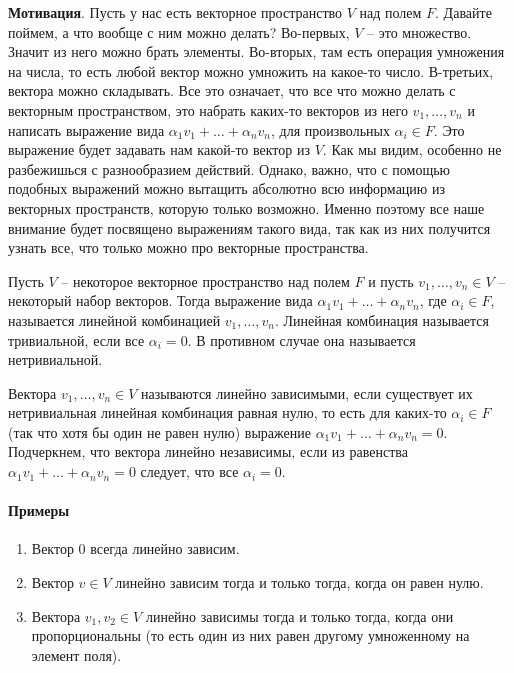 \documentclass{article}
\begin{document}
\textbf{Мотивация}. Пусть у нас есть векторное пространство $V$ над полем $F$.
Давайте поймем, а что вообще с ним можно делать?
Во-первых, $V$ -- это множество.
Значит из него можно брать элементы.
Во-вторых, там есть операция умножения на числа, то есть любой вектор можно умножить на какое-то число.
В-третьих, вектора можно складывать.
Все это означает, что все что можно делать с векторным пространством, это набрать каких-то векторов из него $v_1,\ldots,v_n$ и написать выражение вида $\alpha_1 v_1 + \ldots + \alpha_n v_n$, для произвольных $\alpha_i\in F$.
Это выражение будет задавать нам какой-то вектор из $V$.
Как мы видим, особенно не разбежишься с разнообразием действий.
Однако, важно, что с помощью подобных выражений можно вытащить абсолютно всю информацию из векторных пространств, которую только возможно.
Именно поэтому все наше внимание будет посвящено выражениям такого вида, так как из них получится узнать все, что только можно про векторные пространства.

\begin{definition*}
	Пусть $V$ -- некоторое векторное пространство над полем $F$ и пусть $v_1,\ldots,v_n\in V$ -- некоторый набор векторов.
	Тогда выражение вида $\alpha_1 v_1 +\ldots + \alpha_n v_n$, где $\alpha_i\in F$, называется линейной комбинацией $v_1,\ldots,v_n$.
	Линейная комбинация называется тривиальной, если все $\alpha_i = 0$.
	В противном случае она называется нетривиальной.
\end{definition*}

\begin{definition*}
	Вектора $v_1,\ldots,v_n\in V$ называются линейно зависимыми, если существует их нетривиальная линейная комбинация равная нулю, то есть для каких-то $\alpha_i\in F$ (так что хотя бы один не равен нулю) выражение $\alpha_1 v_1+\ldots + \alpha_n v_n = 0$.
	Подчеркнем, что вектора линейно независимы, если из равенства $\alpha_1 v_1 + \ldots + \alpha_n v_n = 0$ следует, что все $\alpha_i = 0$.
\end{definition*}

\paragraph{Примеры}

\begin{enumerate}
	\item Вектор $0$ всегда линейно зависим.
	
	\item Вектор $v\in V$ линейно зависим тогда и только тогда, когда он равен нулю.
	
	\item Вектора $v_1, v_2 \in V$ линейно зависимы тогда и только тогда, когда они пропорциональны (то есть один из них равен другому умноженному на элемент поля).
\end{enumerate}
\end{document}
